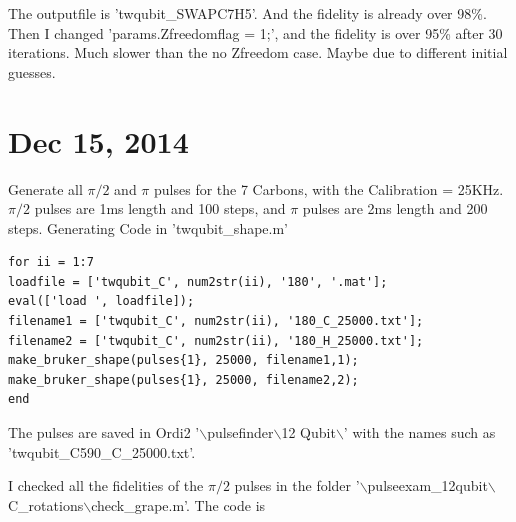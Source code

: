 \documentclass[prl,onecolumn]{revtex4-1}
\newcommand{\dir}{$\backslash$}
\begin{document}
The outputfile is 'twqubit\_SWAPC7H5'. And the fidelity is already over 98\%. Then I changed 'params.Zfreedomflag = 1;', and the fidelity is over 95\% after 30 iterations. Much slower than the no Zfreedom case. Maybe due to different initial guesses.

\newpage

\section{Dec 15, 2014}

Generate all $\pi/2$ and $\pi$ pulses for the 7 Carbons, with the Calibration = 25KHz. $\pi/2$ pulses are 1ms length and 100 steps, and $\pi$ pulses are 2ms length and 200 steps. Generating Code in 'twqubit\_shape.m'

\begin{lstlisting}
for ii = 1:7
loadfile = ['twqubit_C', num2str(ii), '180', '.mat'];
eval(['load ', loadfile]);
filename1 = ['twqubit_C', num2str(ii), '180_C_25000.txt'];
filename2 = ['twqubit_C', num2str(ii), '180_H_25000.txt'];
make_bruker_shape(pulses{1}, 25000, filename1,1);
make_bruker_shape(pulses{1}, 25000, filename2,2);
end
\end{lstlisting}

The pulses are saved in Ordi2 '\dir pulsefinder\dir 12 Qubit\dir' with the names such as\\
'twqubit\_C590\_C\_25000.txt'.

I checked all the fidelities of the $\pi/2$ pulses in the folder '\dir pulseexam\_12qubit\dir C\_rotations\dir check\_grape.m'. The code is
\end{document}
